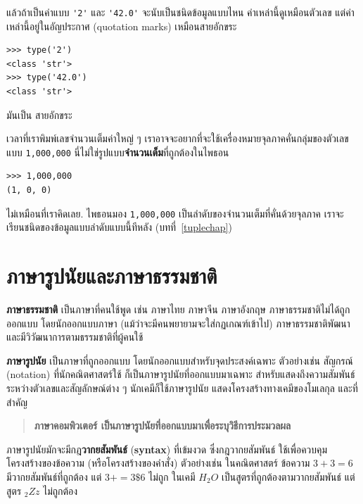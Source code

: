 แล้วถ้าเป็นค่าแบบ \verb"'2'" และ \verb"'42.0'" จะนับเป็นชนิดข้อมูลแบบไหน
ค่าเหล่านี้ดูเหมือนตัวเลข
แต่ค่าเหล่านี้อยู่ในอัญประกาศ (quotation marks) เหมือนสายอักขระ

\begin{verbatim}
>>> type('2')
<class 'str'>
>>> type('42.0')
<class 'str'>
\end{verbatim}
%
มันเป็น สายอักขระ

เวลาที่เราพิมพ์เลขจำนวนเต็มค่าใหญ่ ๆ
เราอาจจะอยากที่จะใช้เครื่องหมายจุลภาคคั่นกลุ่มของตัวเลข แบบ \texttt{1,000,000}  
นี่ไม่ใช่รูปแบบ\textbf{จำนวนเต็ม}ที่ถูกต้องในไพธอน

\begin{verbatim}
>>> 1,000,000
(1, 0, 0)
\end{verbatim}
%
ไม่เหมือนที่เราคิดเลย. 
ไพธอนมอง \texttt{1,000,000} 
เป็นลำดับของจำนวนเต็มที่คั่นด้วยจุลภาค 
เราจะเรียนชนิดของข้อมูลแบบลำดับแบบนี้ทีหลัง (บทที่~\ref{tuplechap})


\section{ภาษารูปนัยและภาษาธรรมชาติ}

\textbf{ภาษาธรรมชาติ} เป็นภาษาที่คนใช้พูด เช่น ภาษาไทย ภาษาจีน ภาษาอังกฤษ
ภาษาธรรมชาติไม่ได้ถูกออกแบบ โดยนักออกแบบภาษา (แม้ว่าจะมีคนพยายามจะใส่กฏเกณฑ์เข้าไป)
ภาษาธรรมชาติพัฒนาและมีวิวัฒนาการตามธรรมชาติที่ผู้คนใช้

\textbf{ภาษารูปนัย} เป็นภาษาที่ถูกออกแบบ โดยนักออกแบบสำหรับจุดประสงค์เฉพาะ
ตัวอย่างเช่น สัญกรณ์ (notation) ที่นักคณิตศาสตร์ใช้
ก็เป็นภาษารูปนัยที่ออกแบบมาเฉพาะ 
สำหรับแสดงถึงความสัมพันธ์ระหว่างตัวเลขและสัญลักษณ์ต่าง ๆ
นักเคมีก็ใช้ภาษารูปนัย แสดงโครงสร้างทางเคมีของโมเลกุล
และที่สำคัญ

\begin{quote}
\textbf{ภาษาคอมพิวเตอร์ 
	เป็นภาษารูปนัยที่ออกแบบมาเพื่อระบุวิธีการประมวลผล}
\end{quote}

ภาษารูปนัยมักจะมีกฎ\textbf{วากยสัมพันธ์} (\textbf{syntax}) ที่เข้มงวด 
ซึ่งกฎวากยสัมพันธ์ ใช้เพื่อควบคุมโครงสร้างของข้อความ (หรือโครงสร้างของคำสั่ง) 
ตัวอย่างเช่น ในคณิตศาสตร์ ข้อความ
{\scriptsize$3 + 3 = 6$} มีวากยสัมพันธ์ที่ถูกต้อง
แต่
{\scriptsize$3 + = 3 \$ 6$} ไม่ถูก  
ในเคมี
{\scriptsize$H_2O$}
เป็นสูตรที่ถูกต้องตามวากยสัมพันธ์
แต่สูตร {\scriptsize$_2Zz$} ไม่ถูกต้อง

